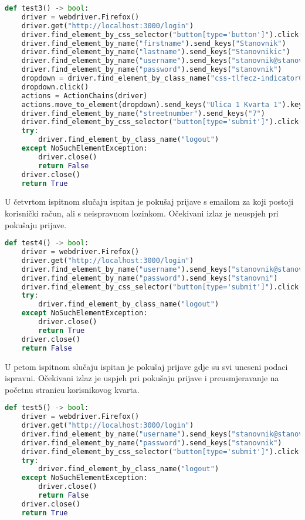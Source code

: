			\begin{lstlisting}[language=Python, breaklines=true]
def test3() -> bool:
    driver = webdriver.Firefox()
    driver.get("http://localhost:3000/login")
    driver.find_element_by_css_selector("button[type='button']").click()
    driver.find_element_by_name("firstname").send_keys("Stanovnik")
    driver.find_element_by_name("lastname").send_keys("Stanovnikic")
    driver.find_element_by_name("username").send_keys("stanovnik@stanovnik.com")
    driver.find_element_by_name("password").send_keys("stanovnik")
    dropdown = driver.find_element_by_class_name("css-tlfecz-indicatorContainer")
    dropdown.click()
    actions = ActionChains(driver)
    actions.move_to_element(dropdown).send_keys("Ulica 1 Kvarta 1").key_down(Keys.ENTER).key_up(Keys.ENTER).perform()
    driver.find_element_by_name("streetnumber").send_keys("7")
    driver.find_element_by_css_selector("button[type='submit']").click()
    try:
        driver.find_element_by_class_name("logout")
    except NoSuchElementException:
        driver.close()
        return False
    driver.close()
    return True	
			\end{lstlisting}
			
			U četvrtom ispitnom slučaju ispitan je pokušaj prijave s emailom za koji postoji korisnički račun, ali s neispravnom lozinkom. Očekivani izlaz je neuspjeh pri pokušaju prijave.
			
			\begin{lstlisting}[language=Python, breaklines=true]
def test4() -> bool:
    driver = webdriver.Firefox()
    driver.get("http://localhost:3000/login")
    driver.find_element_by_name("username").send_keys("stanovnik@stanovnik.com")
    driver.find_element_by_name("password").send_keys("stanovni")
    driver.find_element_by_css_selector("button[type='submit']").click()
    try:
        driver.find_element_by_class_name("logout")
    except NoSuchElementException:
        driver.close()
        return True
    driver.close()
    return False
			\end{lstlisting}
			
			U petom ispitnom slučaju ispitan je pokušaj prijave gdje su svi uneseni podaci ispravni. Očekivani izlaz je uspjeh pri pokušaju prijave i preusmjeravanje na početnu stranicu korisnikovog kvarta.
			
			\begin{lstlisting}[language=Python, breaklines=true]
def test5() -> bool:
    driver = webdriver.Firefox()
    driver.get("http://localhost:3000/login")
    driver.find_element_by_name("username").send_keys("stanovnik@stanovnik.com")
    driver.find_element_by_name("password").send_keys("stanovnik")
    driver.find_element_by_css_selector("button[type='submit']").click()
    try:
        driver.find_element_by_class_name("logout")
    except NoSuchElementException:
        driver.close()
        return False
    driver.close()
    return True
			\end{lstlisting}
			
